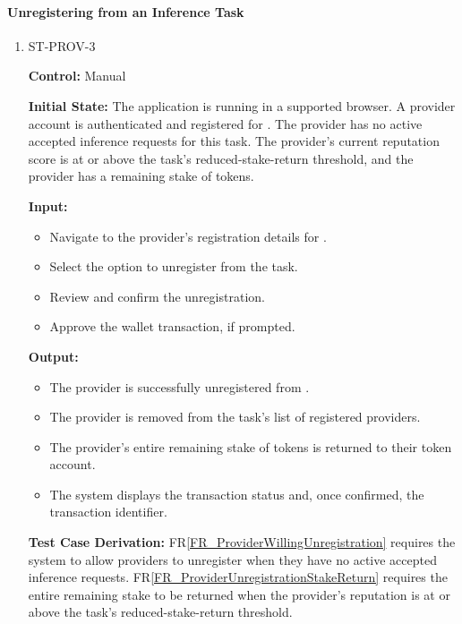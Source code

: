 \documentclass[12pt]{article}
\newcommand{\rref}[1]{FR\ref{#1}}
\newcommand{\fixture}[1]{\texttt{\seqsplit{#1}}}
\begin{document}
\paragraph{Unregistering from an Inference Task}

\begin{enumerate}

\item{ST-PROV-3\\}

\textbf{Control:} Manual

\textbf{Initial State:} The application is running in a supported browser. A provider
account is authenticated and registered for \fixture{TASK-03}. The provider
has no active accepted inference requests for this task. The provider's
current reputation score is at or above the task's reduced-stake-return
threshold, and the provider has a remaining stake of tokens.

\textbf{Input:}
\begin{itemize}
\item[1.] Navigate to the provider's registration details for
\fixture{TASK-03}.
\item[2.] Select the option to unregister from the task.
\item[3.] Review and confirm the unregistration.
\item[4.] Approve the wallet transaction, if prompted.
\end{itemize}

\textbf{Output:}
\begin{itemize}
\item[1.] The provider is successfully unregistered from \fixture{TASK-03}.
\item[2.] The provider is removed from the task's list of registered providers.
\item[3.] The provider's entire remaining stake of tokens is returned to
their token account.
\item[4.] The system displays the transaction status and, once confirmed, the
transaction identifier.
\end{itemize}

\textbf{Test Case Derivation:} \rref{FR_ProviderWillingUnregistration} requires the system
to allow providers to unregister when they have no active accepted inference
requests. \rref{FR_ProviderUnregistrationStakeReturn} requires the entire
remaining stake to be returned when the provider's reputation is at or above
the task's reduced-stake-return threshold.


\end{enumerate}
\end{document}
